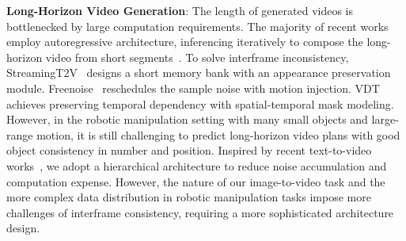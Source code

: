 {\parskip=2pt
\noindent\textbf{Long-Horizon Video Generation}: 
The length of generated videos is bottlenecked by large computation requirements. The majority of recent works employ autoregressive architecture, inferencing iteratively to compose the long-horizon video from short segments~\cite{opensora,streamingt2v,freenoise,genlvideo,freelong,vdt}. To solve interframe inconsistency, StreamingT2V~\cite{streamingt2v} designs a short memory bank with an appearance preservation module. Freenoise~\cite{freenoise} reschedules the sample noise with motion injection. VDT~\cite{vdt} achieves preserving temporal dependency with spatial-temporal mask
modeling. However, in the robotic manipulation setting with many small objects and large-range motion, it is still challenging to predict long-horizon video plans with good object consistency in number and position. Inspired by recent text-to-video works~\cite{nuwa}, we adopt a hierarchical architecture to reduce noise accumulation and computation expense. However, the nature of our image-to-video task and the more complex data distribution in robotic manipulation tasks impose more challenges of interframe consistency, requiring a more sophisticated architecture design.}
